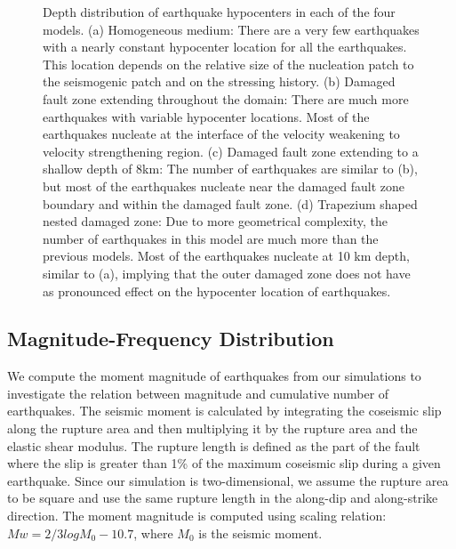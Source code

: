 \documentclass[11pt]{article}
\begin{document}
\begin{figure}[!htb]
{    }
    \caption{Depth distribution of earthquake hypocenters in each of the four models. (a) Homogeneous medium: There are a very few earthquakes with a nearly constant hypocenter location for all the earthquakes. This location depends on the relative size of the nucleation patch to the seismogenic patch and on the stressing history. (b) Damaged fault zone extending throughout the domain: There are much more earthquakes with variable hypocenter locations. Most of the earthquakes nucleate at the interface of the velocity weakening to velocity strengthening region. (c) Damaged fault zone extending to a shallow depth of 8km: The number of earthquakes are similar to (b), but most of the earthquakes nucleate near the damaged fault zone boundary and within the damaged fault zone. (d) Trapezium shaped nested damaged zone: Due to more geometrical complexity, the number of earthquakes in this model are much more than the previous models. Most of the earthquakes nucleate at 10 km depth, similar to (a), implying that the outer damaged zone does not have as pronounced effect on the hypocenter location of earthquakes.}
\end{figure}

\subsection{Magnitude-Frequency Distribution}
We compute the moment magnitude of earthquakes from our simulations to investigate the relation between magnitude and cumulative number of earthquakes. The seismic moment is calculated by integrating the coseismic slip along the rupture area and then multiplying it by the rupture area and the elastic shear modulus. The rupture length is defined as the part of the fault where the slip is greater than 1\% of the maximum coseismic slip during a given earthquake. Since our simulation is two-dimensional, we assume the rupture area to be square and use the same rupture length in the along-dip and along-strike direction. The moment magnitude is computed using \citet{kanamori_1975} scaling relation: $Mw=2/3 logM_0-10.7$, where $M_0$ is the seismic moment.
\end{document}
